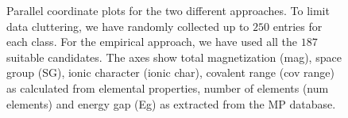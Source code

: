 \documentclass[superscriptaddress,unsortedaddress,
 amsmath,amssymb,
 aps,
]{revtex4-2}
\begin{document}
\begin{figure}[t] %
    \centering
    \begin{subfigure}{1\textwidth}
        \centering
        \scalebox{0.85}{}
    \end{subfigure}
    \begin{subfigure}{1\textwidth}
        \centering
          \scalebox{0.85}{}
    \end{subfigure}
    \caption{Parallel coordinate plots for the two different approaches. To limit data cluttering, we have randomly collected up to $250$ entries for each class. For the empirical approach, we have used all the $187$ suitable candidates. The axes show total magnetization (mag), space group (SG), ionic character (ionic char), covalent range (cov range) as calculated from elemental properties, number of elements (num elements) and energy gap (Eg) as extracted from the MP database.} 
    \label{fig:parallel-coordinates-approaches}
\end{figure}
\end{document}
